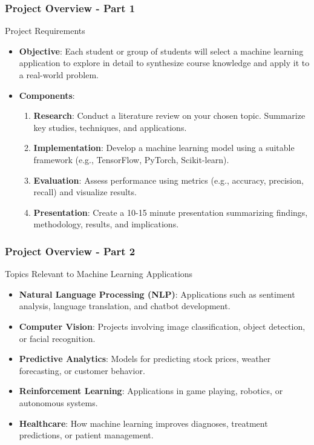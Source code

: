 \documentclass{beamer}
\begin{document}
\begin{frame}[fragile]
    \frametitle{Project Overview - Part 1}
    \begin{block}{Project Requirements}
        \begin{itemize}
            \item \textbf{Objective}: Each student or group of students will select a machine learning application to explore in detail to synthesize course knowledge and apply it to a real-world problem.
            
            \item \textbf{Components}:
            \begin{enumerate}
                \item \textbf{Research}: Conduct a literature review on your chosen topic. Summarize key studies, techniques, and applications.
                \item \textbf{Implementation}: Develop a machine learning model using a suitable framework (e.g., TensorFlow, PyTorch, Scikit-learn).
                \item \textbf{Evaluation}: Assess performance using metrics (e.g., accuracy, precision, recall) and visualize results.
                \item \textbf{Presentation}: Create a 10-15 minute presentation summarizing findings, methodology, results, and implications.
            \end{enumerate}
        \end{itemize}
    \end{block}
\end{frame}

\begin{frame}[fragile]
    \frametitle{Project Overview - Part 2}
    \begin{block}{Topics Relevant to Machine Learning Applications}
        \begin{itemize}
            \item \textbf{Natural Language Processing (NLP)}: Applications such as sentiment analysis, language translation, and chatbot development.
            \item \textbf{Computer Vision}: Projects involving image classification, object detection, or facial recognition.
            \item \textbf{Predictive Analytics}: Models for predicting stock prices, weather forecasting, or customer behavior.
            \item \textbf{Reinforcement Learning}: Applications in game playing, robotics, or autonomous systems.
            \item \textbf{Healthcare}: How machine learning improves diagnoses, treatment predictions, or patient management.
        \end{itemize}
    \end{block}
\end{frame}
\end{document}
